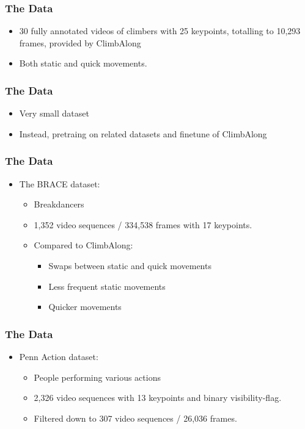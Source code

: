 \documentclass{beamer}
\begin{document}
\begin{frame}
    \frametitle{The Data}
    \begin{itemize}
        \item<1-> 30 fully annotated videos of climbers with 25 keypoints, totalling to 10,293 frames, provided by ClimbAlong
        \item<2-> Both static and quick movements.
    \end{itemize}
\end{frame}

\begin{frame}
    \frametitle{The Data}
    \begin{itemize}
        \item<1-> Very small dataset
        \item<2-> Instead, pretraing on related datasets and finetune of ClimbAlong
    \end{itemize}
\end{frame}

\begin{frame}
    \frametitle{The Data}
    \begin{itemize}
        \item<1-> The BRACE dataset:
        \begin{itemize}
            \item<1-> Breakdancers
            \item<2-> 1,352 video sequences / 334,538 frames with 17 keypoints.
            \item<3-> Compared to ClimbAlong:
            \begin{itemize}
                \item Swaps between static and quick movements
                \item Less frequent static movements
                \item Quicker movements
            \end{itemize}
        \end{itemize}
    \end{itemize}
\end{frame}

\begin{frame}
    \frametitle{The Data}
    \begin{itemize}
        \item<1-> Penn Action dataset:
        \begin{itemize}
            \item<1-> People performing various actions
            \item<2-> 2,326 video sequences with 13 keypoints and binary visibility-flag.
            \item<3-> Filtered down to 307 video sequences / 26,036 frames.
        \end{itemize}
    \end{itemize}
\end{frame}
\end{document}
